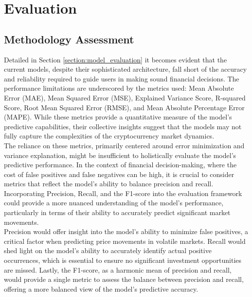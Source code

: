 \section{Evaluation}

\subsection{Methodology Assessment}
Detailed in Section \ref{section:model_evaluation} it becomes evident that the current models, despite their sophisticated architecture, fall short of the accuracy and reliability required to guide users in making sound financial decisions. The performance limitations are underscored by the metrics used: Mean Absolute Error (MAE), Mean Squared Error (MSE), Explained Variance Score, R-squared Score, Root Mean Squared Error (RMSE), and Mean Absolute Percentage Error (MAPE). While these metrics provide a quantitative measure of the model's predictive capabilities, their collective insights suggest that the models may not fully capture the complexities of the cryptocurrency market dynamics. \\ 

The reliance on these metrics, primarily centered around error minimization and variance explanation, might be insufficient to holistically evaluate the model's predictive performance. In the context of financial decision-making, where the cost of false positives and false negatives can be high, it is crucial to consider metrics that reflect the model's ability to balance precision and recall. Incorporating Precision, Recall, and the F1-score into the evaluation framework could provide a more nuanced understanding of the model's performance, particularly in terms of their ability to accurately predict significant market movements. \\

Precision would offer insight into the model's ability to minimize false positives, a critical factor when predicting price movements in volatile markets. Recall would shed light on the model's ability to accurately identify actual positive occurrences, which is essential to ensure no significant investment opportunities are missed. Lastly, the F1-score, as a harmonic mean of precision and recall, would provide a single metric to assess the balance between precision and recall, offering a more balanced view of the model's predictive accuracy. \\

